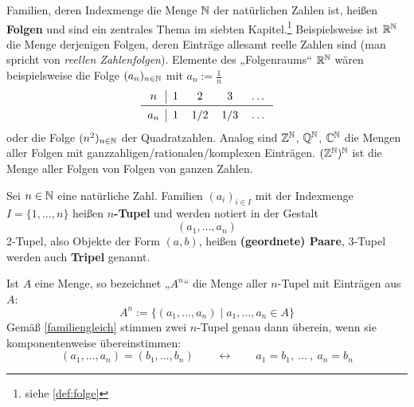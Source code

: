 \begin{bsp}[Folgen]
    Familien, deren Indexmenge die Menge $\mathbb N$ der natürlichen Zahlen ist, heißen \textbf{Folgen} und sind ein zentrales Thema im siebten Kapitel.\footnote{siehe \cref{def:folge}} Beispielsweise ist $\mathbb R^\mathbb N$ die Menge derjenigen Folgen, deren Einträge allesamt reelle Zahlen sind (man spricht von \emph{reellen Zahlenfolgen}). Elemente des „Folgenraums“ $\mathbb R^\mathbb N$ wären beispielsweise die Folge $(a_n)_{n\in\mathbb N}$ mit $a_n:=\frac{1}{n}$
    \[\begin{tabular}{c|cccc}
            $n$ & $1$ & $2$ & $3$ & $\dots$ \\
            \midrule
            $a_n$ & $1$ & $1/2$ & $1/3$ & $\dots$
    \end{tabular}\]
    oder die Folge $(n^2)_{n\in \mathbb N}$ der Quadratzahlen. Analog sind $\mathbb Z^\mathbb N$, $\mathbb Q^\mathbb N$, $\mathbb C^\mathbb N$ die Mengen aller Folgen mit ganzzahligen/rationalen/komplexen Einträgen. $(\mathbb Z^\mathbb N)^\mathbb N$ ist die Menge aller Folgen von Folgen von ganzen Zahlen.
\end{bsp}


\begin{defin}[Tupel] \label{def:tupel} 
    Sei $n\in \mathbb N$ eine natürliche Zahl. Familien $(a_i)_{i\in I}$ mit der Indexmenge $I=\{1,\dots,n\}$ heißen \textbf{$n$-Tupel} und werden notiert in der Gestalt
        \[ (a_1,\dots,a_n)  \]
    2-Tupel, also Objekte der Form $(a,b)$, heißen \textbf{(geordnete) Paare}, 3-Tupel werden auch \textbf{Tripel} genannt.
    
    Ist $A$ eine Menge, so bezeichnet „$A^n$“ die Menge aller $n$-Tupel mit Einträgen aus $A$:
        \[ A^n := \{ (a_1,\dots , a_n) \mid a_1,\dots , a_n \in A \} \]
    Gemäß \cref{familiengleich} stimmen zwei $n$-Tupel genau dann überein, wenn sie komponentenweise übereinstimmen:
	\[ (a_1,\dots , a_n)=(b_1,\dots , b_n) \qquad\leftrightarrow\qquad a_1=b_1,\ \ldots\ ,\ a_n=b_n \]
\end{defin}


